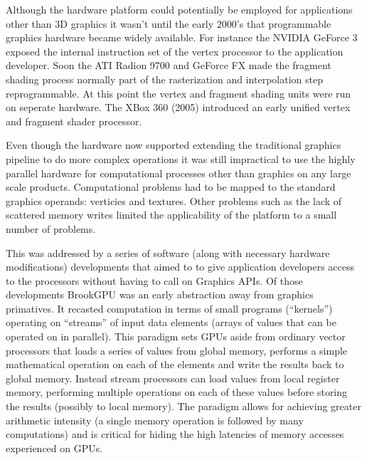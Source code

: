 Although the hardware platform could potentially be employed for applications other than 3D graphics it wasn't until the early 2000's that programmable graphics hardware became widely
available. For instance the NVIDIA GeForce 3 exposed the internal instruction set of the vertex processor to the application developer. Soon the ATI Radion 9700 and GeForce FX 
made the fragment shading process normally part of the rasterization and interpolation step reprogrammable. At this point the vertex and fragment shading units were run on seperate
hardware. The XBox 360 (2005) introduced an early unified vertex and fragment shader processor.

Even though the hardware now supported extending the traditional graphics pipeline to do more complex operations it was still impractical to use the highly parallel hardware for 
computational processes other than graphics on any large scale products. Computational problems had to be mapped to the standard graphics operands: verticies and textures. Other problems
such as the lack of scattered memory writes limited the applicability of the platform to a small number of problems.

This was addressed by a series of software (along with necessary hardware modifications) developments that aimed to to give application developers access to the processors without having to call
on Graphics APIs. Of those developments BrookGPU \cite{buck2004brook} was an early abstraction away from graphics primatives. It recasted computation in terms of small programs (``kernels'') operating
on ``streams'' of input data elements (arrays of values that can be operated on in parallel). This paradigm sets GPUs aside from ordinary vector processors that loads a series of values from global
memory, performs a simple mathematical operation on each of the elements and write the results back to global memory. Instead stream processors can load values from local register memory, performing multiple
operations on each of these values before storing the results (possibly to local memory). The paradigm allows for achieving greater arithmetic intensity (a single memory operation is followed
by many computations) and is critical for hiding the high latencies of memory accesses experienced on GPUs. 

